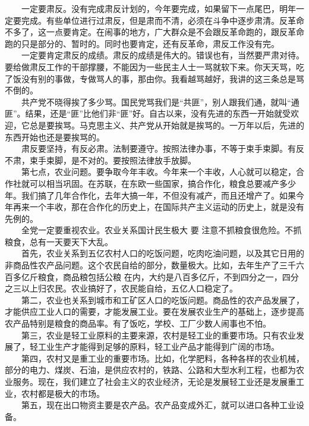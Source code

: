 \documentclass[cn,11pt,chinese]{elegantbook}
\begin{document}
　　一定要肃反。没有完成肃反计划的，今年要完成，如果留下一点尾巴，明年一定要完成。有些单位进行过肃反，但是肃而不清，必须在斗争中逐步肃清。反革命不多了，这一点要肯定。在闹事的地方，广大群众是不会跟反革命跑的，跟反革命跑的只是部分的、暂时的。同时也要肯定，还有反革命，肃反工作没有完。\\
　　一定要肯定肃反的成绩。肃反的成绩是伟大的。错误也有，当然要严肃对待。要给做肃反工作的干部撑腰，不能因为一些民主人士一骂就软下来。你天天骂，吃了饭没有别的事做，专做骂人的事，那由你。我看越骂越好，我讲的这三条总是骂不倒的。\\
　　共产党不晓得挨了多少骂。国民党骂我们是“共匪”，别人跟我们通，就叫“通匪”。结果，还是“匪”比他们非“匪”好。自古以来，没有先进的东西一开始就受欢迎，它总是要挨骂。马克思主义、共产党从开始就是挨骂的。一万年以后，先进的东西开始也还是要挨骂的。\\
　　肃反要坚持，有反必肃。法制要遵守。按照法律办事，不等于束手束脚。有反不肃，束手束脚，是不对的。要按照法律放手放脚。\\
　　第七点，农业问题。要争取今年丰收。今年来一个丰收，人心就可以稳定，合作社就可以相当巩固。在苏联，在东欧一些国家，搞合作化，粮食总要减产多少年。我们搞了几年合作化，去年大搞一年，不但没有减产，而且还增产了。如果今年再来一个丰收，那在合作化的历史上，在国际共产主义运动的历史上，就是没有先例的。\\
　　全党一定要重视农业。农业关系国计民生极大 要 注意不抓粮食很危险。不抓粮食，总有一天要天下大乱。\\
　　首先，农业关系到五亿农村人口的吃饭问题，吃肉吃油问题，以及其它日用的非商品性农产品问题。这个农民自给的部分，数量极大。比如，去年生产了三千六百多亿斤粮食，商品粮包括公粮 在内，大约是八百多亿斤，不到四分之一，四分之三以上归农民。农业搞好了，农民能自给，五亿人口稳定了。\\
　　第二，农业也关系到城市和工矿区人口的吃饭问题。商品性的农产品发展了，才能供应工业人口的需要，才能发展工业。要在发展农业生产的基础上，逐步提高农产品特别是粮食的商品率。有了饭吃，学校、工厂少数人闹事也不怕。\\
　　第三，农业是轻工业原料的主要来源，农村是轻工业的重要市场。只有农业发展了，轻工业生产才能得到足够的原料，轻工业产品才能得到广阔的市场。\\
　　第四，农村又是重工业的重要市场。比如，化学肥料，各种各样的农业机械，部分的电力、煤炭、石油，是供应农村的，铁路、公路和大型水利工程，也都为农业服务。现在，我们建立了社会主义的农业经济，无论是发展轻工业还是发展重工业，农村都是极大的市场。\\
　　第五，现在出口物资主要是农产品。农产品变成外汇，就可以进口各种工业设备。\\
\end{document}
